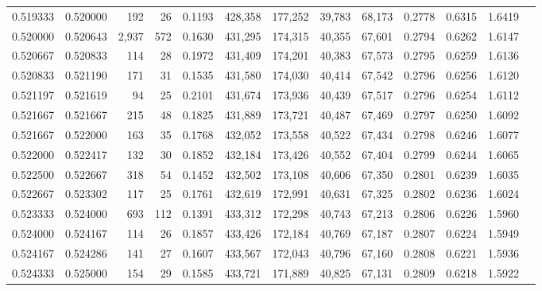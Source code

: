 \begin{tabular}{rrrrrrrrrrrrr}
0.519333 & 0.520000 &   192 &  26 &                                     0.1193 & 428,358 & 177,252 &  39,783 &  68,173 & 0.2778 & 0.6315 & 1.6419 \\
0.520000 & 0.520643 & 2,937 & 572 &                                     0.1630 & 431,295 & 174,315 &  40,355 &  67,601 & 0.2794 & 0.6262 & 1.6147 \\
0.520667 & 0.520833 &   114 &  28 &                                     0.1972 & 431,409 & 174,201 &  40,383 &  67,573 & 0.2795 & 0.6259 & 1.6136 \\
0.520833 & 0.521190 &   171 &  31 &                                     0.1535 & 431,580 & 174,030 &  40,414 &  67,542 & 0.2796 & 0.6256 & 1.6120 \\
0.521197 & 0.521619 &    94 &  25 &                                     0.2101 & 431,674 & 173,936 &  40,439 &  67,517 & 0.2796 & 0.6254 & 1.6112 \\
0.521667 & 0.521667 &   215 &  48 &                                     0.1825 & 431,889 & 173,721 &  40,487 &  67,469 & 0.2797 & 0.6250 & 1.6092 \\
0.521667 & 0.522000 &   163 &  35 &                                     0.1768 & 432,052 & 173,558 &  40,522 &  67,434 & 0.2798 & 0.6246 & 1.6077 \\
0.522000 & 0.522417 &   132 &  30 &                                     0.1852 & 432,184 & 173,426 &  40,552 &  67,404 & 0.2799 & 0.6244 & 1.6065 \\
0.522500 & 0.522667 &   318 &  54 &                                     0.1452 & 432,502 & 173,108 &  40,606 &  67,350 & 0.2801 & 0.6239 & 1.6035 \\
0.522667 & 0.523302 &   117 &  25 &                                     0.1761 & 432,619 & 172,991 &  40,631 &  67,325 & 0.2802 & 0.6236 & 1.6024 \\
0.523333 & 0.524000 &   693 & 112 &                                     0.1391 & 433,312 & 172,298 &  40,743 &  67,213 & 0.2806 & 0.6226 & 1.5960 \\
0.524000 & 0.524167 &   114 &  26 &                                     0.1857 & 433,426 & 172,184 &  40,769 &  67,187 & 0.2807 & 0.6224 & 1.5949 \\
0.524167 & 0.524286 &   141 &  27 &                                     0.1607 & 433,567 & 172,043 &  40,796 &  67,160 & 0.2808 & 0.6221 & 1.5936 \\
0.524333 & 0.525000 &   154 &  29 &                                     0.1585 & 433,721 & 171,889 &  40,825 &  67,131 & 0.2809 & 0.6218 & 1.5922 \\

\end{tabular}
